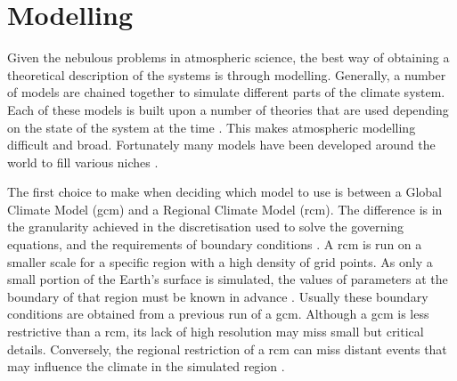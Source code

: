 \chapter{Modelling}
\label{ch:model}

Given the nebulous problems in atmospheric science, the best way of obtaining a theoretical description of the systems is through modelling. Generally, a number of models are chained together to simulate different parts of the climate system. Each of these models is built upon a number of theories that are used depending on the state of the system at the time \citep[Chapter 21]{jacobson2005fundamentals}. This makes atmospheric modelling difficult and broad. Fortunately many models have been developed around the world to fill various niches \citep{draxler:1997tga, mann:2010wb, cope:2009tz, mcgregor2008updated}.

The first choice to make when deciding which model to use is between a Global Climate Model (\gls{gcm}) and a Regional Climate Model (\gls{rcm}). The difference is in the granularity achieved in the discretisation used to solve the governing equations, and the requirements of boundary conditions \citep{thatcher:2015wy}. A \gls{rcm} is run on a smaller scale for a specific region with a high density of grid points. As only a small portion of the Earth's surface is simulated, the values of parameters at the boundary of that region must be known in advance \citep{hurley2002air}. Usually these boundary conditions are obtained from a previous run of a \gls{gcm}. Although a \gls{gcm} is less restrictive than a \gls{rcm}, its lack of high resolution may miss small but critical details. Conversely, the regional restriction of a \gls{rcm} can miss distant events that may influence the climate in the simulated region \citep[Chapter 25]{seinfeld2012atmospheric}.




